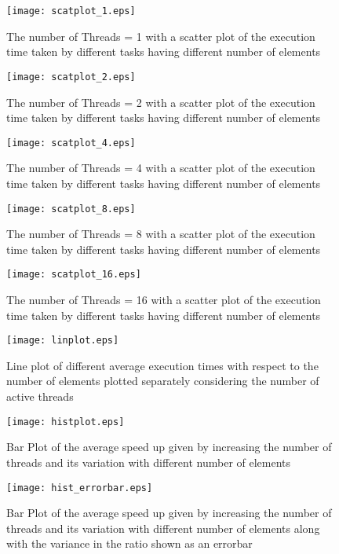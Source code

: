 \documentclass[]{article}
\begin{document}
\begin{figure}
  \centering
  \texttt{[image: scatplot\_1.eps]}
  \caption{The number of Threads = 1 with a scatter plot of the execution time taken by different tasks having different number of elements}
\end{figure}

\begin{figure}
  \texttt{[image: scatplot\_2.eps]}
  \caption{The number of Threads = 2 with a scatter plot of the execution time taken by different tasks having different number of elements}
\end{figure}
\begin{figure}
  \texttt{[image: scatplot\_4.eps]}
  \caption{The number of Threads = 4 with a scatter plot of the execution time taken by different tasks having different number of elements}
\end{figure}

\begin{figure}
  \texttt{[image: scatplot\_8.eps]}
  \caption{The number of Threads = 8 with a scatter plot of the execution time taken by different tasks having different number of elements}
\end{figure}

\begin{figure}
  \texttt{[image: scatplot\_16.eps]}
  \caption{The number of Threads = 16 with a scatter plot of the execution time taken by different tasks having different number of elements}
\end{figure}

\begin{figure}
  \texttt{[image: linplot.eps]}
  \caption{Line plot of different average execution times with respect to the number of elements plotted separately considering the number of active threads}
\end{figure}

\begin{figure}
  \texttt{[image: histplot.eps]}
  \caption{Bar Plot of the average speed up given by increasing the number of threads and its variation with different number of elements}
\end{figure}

\begin{figure}
  \texttt{[image: hist\_errorbar.eps]}
  \caption{Bar Plot of the average speed up given by increasing the number of threads and its variation with different number of elements along with the variance in the ratio shown as an errorbar}
\end{figure}
\end{document}
